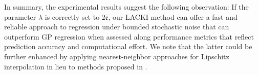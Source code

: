 \documentclass{article} %
\theoremstyle{definition}
\theoremstyle{remark}
\newcommand{\abs}[1]{\left\vert#1\right\vert}
\newcommand{\data}{\ensuremath{ \mathcal D} }
\newcommand{\inspace}{\ensuremath{ \mathcal X}}
\newcommand{\hestthresh}{\ensuremath{ \lambda}}
\newcommand{\obserrbnd}{\bar{\mathfrak e}}
\begin{document}
In summary, the experimental results suggest the following observation: If the parameter $\hestthresh$ is correctly set to $2 \obserrbnd$, our LACKI method can offer a fast and reliable approach to regression under bounded stochastic noise that can outperform GP regression when assessed along performance metrics that reflect prediction accuracy and computational effort. We note that the latter could be further enhanced by applying nearest-neighbor approaches for Lipschitz interpolation in lieu to methods proposed in  \cite{Beliakov2006,calliess2014_thesis}.
%
%
%
%

%
%
 
\end{document}
